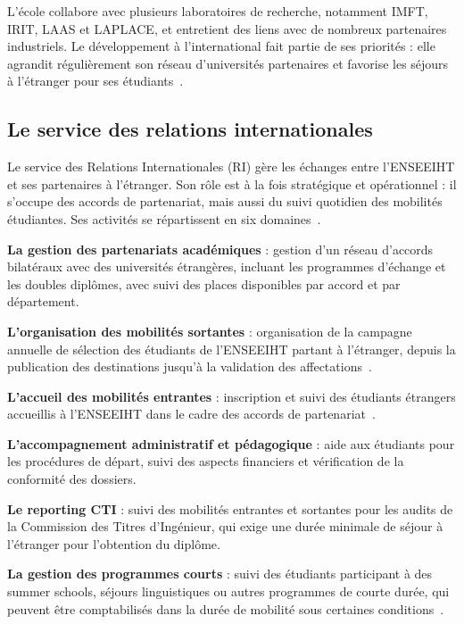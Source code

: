 L'école collabore avec plusieurs laboratoires de recherche, notamment IMFT, IRIT, LAAS et LAPLACE, et entretient des liens avec de nombreux partenaires industriels. Le développement à l'international fait partie de ses priorités : elle agrandit régulièrement son réseau d'universités partenaires et favorise les séjours à l'étranger pour ses étudiants~\cite{enseeiht_presentation}.

\subsection{Le service des relations internationales}
\label{sec:accueil-ri}

Le service des Relations Internationales (RI) gère les échanges entre l'ENSEEIHT et ses partenaires à l'étranger. Son rôle est à la fois stratégique et opérationnel : il s'occupe des accords de partenariat, mais aussi du suivi quotidien des mobilités étudiantes. Ses activités se répartissent en six domaines~\cite{enseeiht_international}.

\textbf{La gestion des partenariats académiques} : gestion d'un réseau d'accords bilatéraux avec des universités étrangères, incluant les programmes d'échange et les doubles diplômes, avec suivi des places disponibles par accord et par département.

\textbf{L'organisation des mobilités sortantes} : organisation de la campagne annuelle de sélection des étudiants de l'ENSEEIHT partant à l'étranger, depuis la publication des destinations jusqu'à la validation des affectations~\cite{enseeiht_sortante}.

\textbf{L'accueil des mobilités entrantes} : inscription et suivi des étudiants étrangers accueillis à l'ENSEEIHT dans le cadre des accords de partenariat~\cite{enseeiht_entrante}.

\textbf{L'accompagnement administratif et pédagogique} : aide aux étudiants pour les procédures de départ, suivi des aspects financiers et vérification de la conformité des dossiers.

\textbf{Le reporting CTI} : suivi des mobilités entrantes et sortantes pour les audits de la Commission des Titres d'Ingénieur, qui exige une durée minimale de séjour à l'étranger pour l'obtention du diplôme.

\textbf{La gestion des programmes courts} : suivi des étudiants participant à des summer schools, séjours linguistiques ou autres programmes de courte durée, qui peuvent être comptabilisés dans la durée de mobilité sous certaines conditions~\cite{enseeiht_programmes_courts}.

